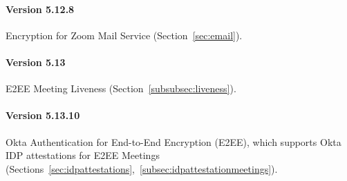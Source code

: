 \paragraph{Version 5.12.8}
Encryption for Zoom Mail Service (Section~\ref{sec:email}).

\paragraph{Version 5.13}
E2EE Meeting Liveness (Section~\ref{subsubsec:liveness}).

\paragraph{Version 5.13.10}
Okta Authentication for End-to-End Encryption (E2EE), which supports Okta IDP attestations for E2EE Meetings
(Sections~\ref{sec:idpattestations},~\ref{subsec:idpattestationmeetings}).
